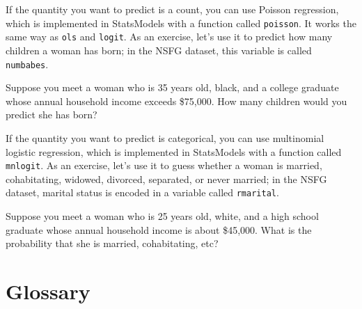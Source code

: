 \documentclass[12pt]{book}
\begin{document}
\begin{exercise}
If the quantity you want to predict is a count, you can use Poisson
regression, which is implemented in StatsModels with a function called
\verb"poisson".  It works the same way as \verb"ols" and \verb"logit".
As an exercise, let's use it to predict how many children a woman
has born; in the NSFG dataset, this variable is called \verb"numbabes".

Suppose you meet a woman who is 35 years old, black, and a college
graduate whose annual household income exceeds \$75,000.  How many
children would you predict she has born?
\end{exercise}


\begin{exercise}
If the quantity you want to predict is categorical, you can use
multinomial logistic regression, which is implemented in StatsModels
with a function called \verb"mnlogit".  As an exercise, let's use it to
guess whether a woman is married, cohabitating, widowed, divorced,
separated, or never married; in the NSFG dataset, marital status is
encoded in a variable called \verb"rmarital".

Suppose you meet a woman who is 25 years old, white, and a high
school graduate whose annual household income is about \$45,000.
What is the probability that she is married, cohabitating, etc?
\end{exercise}




\section{Glossary}
\end{document}
